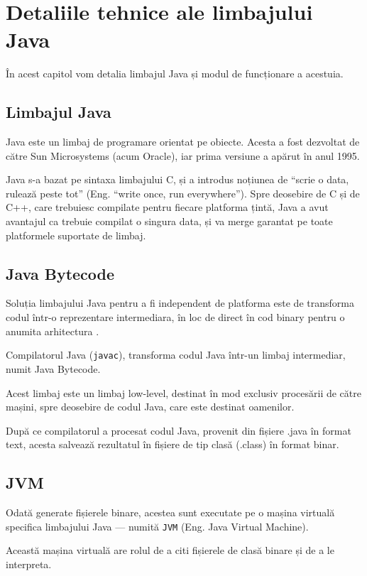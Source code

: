 \chapter{Detaliile tehnice ale limbajului Java}

În acest capitol vom detalia limbajul Java și modul de
funcționare a acestuia.

\section{Limbajul Java}

Java este un limbaj de programare orientat pe obiecte. Acesta a fost
dezvoltat de către Sun Microsystems (acum Oracle), iar prima versiune a
apărut în anul 1995.

Java s-a bazat pe sintaxa limbajului C, și a introdus noțiunea de
``scrie o data, rulează peste tot'' (Eng. ``write once, run
everywhere''). Spre deosebire de C și de C++, care trebuiesc compilate
pentru fiecare platforma țintă, Java a avut avantajul ca trebuie
compilat o singura data, și va merge garantat pe toate platformele
suportate de limbaj.

\section{Java Bytecode}

Soluția limbajului Java pentru a fi independent de platforma este de
transforma codul într-o reprezentare intermediara, în loc de direct în
cod binary pentru o anumita arhitectura .

Compilatorul Java (\texttt{javac}), transforma codul Java într-un limbaj
intermediar, numit Java Bytecode.

Acest limbaj este un limbaj low-level, destinat în mod exclusiv
procesării de către mașini, spre deosebire de codul Java, care este
destinat oamenilor.

După ce compilatorul a procesat codul Java, provenit din fișiere .java în
format text, acesta salvează rezultatul în fișiere de tip clasă (.class)
în format binar.

\section{JVM}

Odată generate fișierele binare, acestea sunt executate pe o mașina
virtuală specifica limbajului Java --- numită \texttt{JVM}
(Eng. Java Virtual Machine).

Această mașina virtuală are rolul de a citi fișierele de clasă binare și
de a le interpreta.

